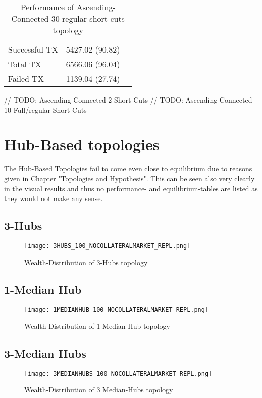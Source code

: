 \documentclass[Bachelorarbeit.tex]{subfiles}
\begin{document}
\begin{table}[H]
	\caption{Performance of Ascending-Connected 30 regular short-cuts topology}
	\centering
	\begin{tabular} { l c r }
		\hline
		Successful TX & 5427.02 (90.82) \\
		Total TX & 6566.06 (96.04) \\
		Failed TX & 1139.04 (27.74) \\
		\hline
	\end{tabular}
\end{table}

// TODO: Ascending-Connected 2 Short-Cuts
// TODO: Ascending-Connected 10 Full/regular Short-Cuts


\section{Hub-Based topologies} 
The Hub-Based Topologies fail to come even close to equilibrium due to reasons given in Chapter "Topologies and Hypothesis". This can be seen also very clearly in the visual results and thus no performance- and equilibrium-tables are listed as they would not make any sense.

\subsection{3-Hubs}
\begin{figure}[H]
	\centering
  \texttt{[image: 3HUBS\_100\_NOCOLLATERALMARKET\_REPL.png]}
	\caption{Wealth-Distribution of 3-Hubs topology}
	\label{fig1}
\end{figure}

\subsection{1-Median Hub}
\begin{figure}[H]
	\centering
  \texttt{[image: 1MEDIANHUB\_100\_NOCOLLATERALMARKET\_REPL.png]}
	\caption{Wealth-Distribution of 1 Median-Hub topology}
	\label{fig1}
\end{figure}

\subsection{3-Median Hubs}
\begin{figure}[H]
	\centering
  \texttt{[image: 3MEDIANHUBS\_100\_NOCOLLATERALMARKET\_REPL.png]}
	\caption{Wealth-Distribution of 3 Median-Hubs topology}
	\label{fig1}
\end{figure}
\end{document}
